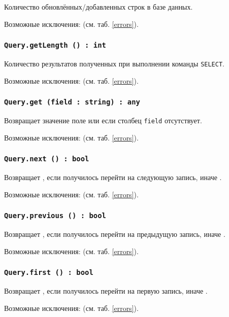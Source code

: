 Количество обновлённых/добавленных строк в базе данных.

Возможные исключения:  (см. таб. \ref{errors}).

\subsubsection{\texttt{Query.getLength () : int}}

Количество результатов полученных при выполнении команды \texttt{SELECT}.

Возможные исключения:  (см. таб. \ref{errors}).

\subsubsection{\texttt{Query.get (field : string) : any}}

Возвращает значение поле или \void{} если столбец \texttt{field} отсутствует.

Возможные исключения:  (см. таб. \ref{errors}).

\subsubsection{\texttt{Query.next () : bool}}

Возвращает \true, если получилось перейти на следующую запись, иначе \false.

Возможные исключения:  (см. таб. \ref{errors}).

\subsubsection{\texttt{Query.previous () : bool}}

Возвращает \true, если получилось перейти на предыдущую запись, иначе \false.

Возможные исключения:  (см. таб. \ref{errors}).

\subsubsection{\texttt{Query.first () : bool}}

Возвращает \true, если получилось перейти на первую запись, иначе \false.

Возможные исключения:  (см. таб. \ref{errors}).


